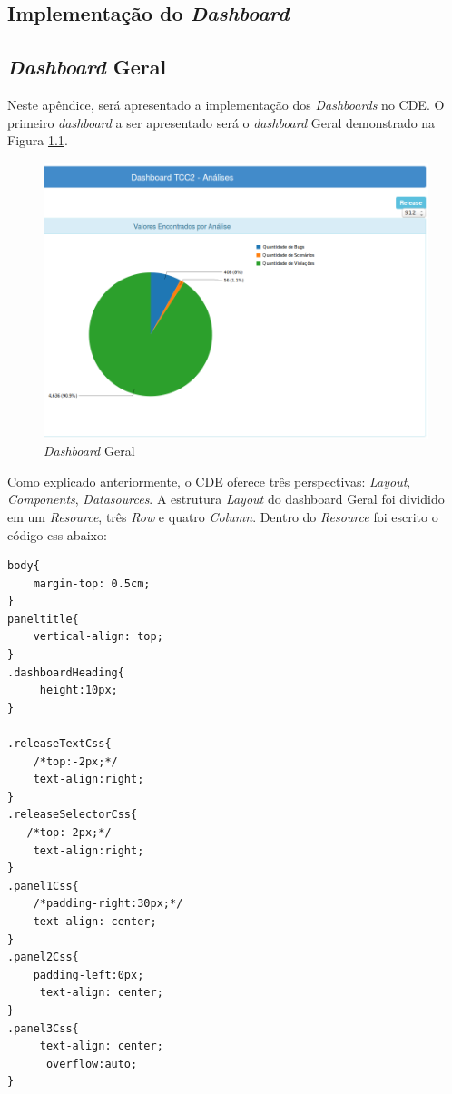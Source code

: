 \begin{apendicesenv}
\chapter{Implementação do \textit{Dashboard}}
\label{sec:implementação-dashboard}

\section{\textit{Dashboard} Geral}

Neste apêndice, será apresentado a implementação dos \textit{Dashboards} no CDE. O primeiro \textit{dashboard} a ser apresentado será o \textit{dashboard} Geral demonstrado na Figura \ref{fig:dashgeral}.

\begin{figure}[h!]
\centering
\includegraphics[keepaspectratio=false,scale=0.5]{figuras/figuras_nilton/dashgeral.png}
\caption{\textit{Dashboard} Geral}
\label{fig:dashgeral}
\end{figure}
\FloatBarrier

Como explicado anteriormente, o CDE oferece três perspectivas: \textit{Layout}, \textit{Components}, \textit{Datasources}. A estrutura  \textit{Layout} do {dashboard} Geral foi dividido em um \textit{Resource}, três \textit{Row} e quatro \textit{Column}. Dentro do \textit{Resource} foi escrito o código css abaixo:

{\color{blue}
\begin{verbatim}
body{
    margin-top: 0.5cm;
} 
paneltitle{
    vertical-align: top; 
}
.dashboardHeading{
     height:10px;
}

.releaseTextCss{
    /*top:-2px;*/  
    text-align:right;
} 
.releaseSelectorCss{
   /*top:-2px;*/  
    text-align:right;
}
.panel1Css{
    /*padding-right:30px;*/
    text-align: center;  
}
.panel2Css{
    padding-left:0px;
     text-align: center;  
}
.panel3Css{
     text-align: center;  
      overflow:auto; 
}


\end{verbatim}}
\end{apendicesenv}
